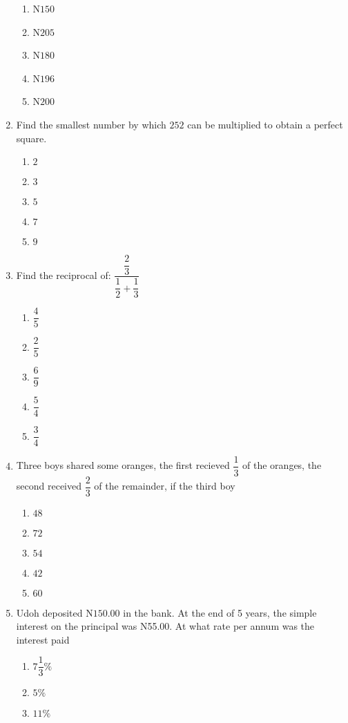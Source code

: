 \begin{multicols}{2}
\begin{enumerate}[label={\arabic*.}]
\begin{enumerate}[label={\Alph*.}]
    \item N\(150\)
    \item N\(205\)
    \item N\(180\)
    \item N\(196\)
    \item N\(200\)
    \end{enumerate}
\item Find the smallest number by which \(252\) can be multiplied to obtain a perfect square. 
    \begin{enumerate}[label={\Alph*.}]
    \item \(2\)
    \item \(3\)
    \item \(5\)
    \item \(7\)
    \item \(9\)
    \end{enumerate}
\item Find the reciprocal of: \(\dfrac{\dfrac{2}{3}}{\dfrac{1}{2} + \dfrac{1}{3}}\)
    \begin{enumerate}[label={\Alph*.}]
    \item \(\dfrac{4}{5}\)
    \item \(\dfrac{2}{5}\)
    \item \(\dfrac{6}{9}\)
    \item \(\dfrac{5}{4}\)
    \item \(\dfrac{3}{4}\)
    \end{enumerate}
\item Three boys shared some oranges, the first recieved \(\dfrac{1}{3}\) of the oranges, the second received \(\dfrac{2}{3}\) of the remainder, if the third boy
    \begin{enumerate}[label={\Alph*.}]
    \item \(48\)
    \item \(72\)
    \item \(54\)
    \item \(42\)
    \item \(60\)
    \end{enumerate}
\item Udoh deposited N\(150.00\) in the bank. At the end of 5 years, the simple interest on the principal was N55.00. At what rate per annum was the interest paid 
    \begin{enumerate}[label={\Alph*.}]
    \item \(7\dfrac{1}{3}\%\)
    \item \(5\%\)
    \item \(11\%\)

\end{enumerate}
\end{enumerate}
\end{multicols}
